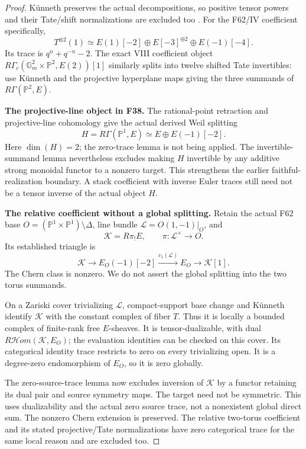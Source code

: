 \documentclass[11pt,a4paper]{article}
\newcommand{\fid}[1]{\textsf{#1}}\newcommand{\gate}[1]{\textsf{#1}}
\theoremstyle{named}\newtheorem{finding}{Finding}[section]
\theoremstyle{definition}\newtheorem{definition}[finding]{Definition}
\theoremstyle{remark}\newtheorem{remark}[finding]{Remark}
\begin{document}
\begin{proof}
K\"unneth preserves the actual decompositions,
so positive tensor powers and their Tate/shift
normalizations are excluded too
\cite[Theorem~22.1 and Remark~22.3(b)--(d),
pp.~135--136, with the following \(\ell\)-adic passage]{Milne}.
For the \fid{F62}/IV coefficient specifically,
\[
 T^{\otimes2}(1)\simeq
 E(1)[-2]\oplus E[-3]^{\oplus2}\oplus E(-1)[-4].
\]
Its trace is \(q^n+q^{-n}-2\).
The exact VIII coefficient object
\(R\Gamma_c(\mathbb G_m^2\times\mathbb P^2,E(2))[1]\)
similarly splits into twelve shifted Tate
invertibles: use K\"unneth and the projective
hyperplane maps giving the three summands of
\(R\Gamma(\mathbb P^2,E)\).

\par\smallskip\noindent\textbf{The projective-line object in \fid{F38}.}\quad
The rational-point retraction and projective-line
cohomology give the actual derived Weil splitting
\[
 H=R\Gamma(\mathbb P^1,E)
       \simeq E\oplus E(-1)[-2].
\]
Here \(\dim(H)=2\); the zero-trace lemma is not
being applied. The invertible-summand lemma
nevertheless excludes making \(H\) invertible
by any additive strong monoidal functor to a
nonzero target.
This strengthens the earlier faithful-realization
boundary. A stack coefficient with inverse
Euler traces still need not be a tensor inverse
of the actual object \(H\).

\par\smallskip\noindent\textbf{The relative coefficient without a global splitting.}\quad
Retain the actual \fid{F62} base
\(O=(\mathbb P^1\times\mathbb P^1)\setminus\Delta\),
line bundle \(\mathcal L=O(1,-1)|_O\), and
\[
 \mathcal K=R\pi_!E,\qquad
 \pi:\mathcal L^\times\to O.
\]
Its established triangle is
\[
 \mathcal K\longrightarrow E_O(-1)[-2]
   \xrightarrow{c_1(\mathcal L)}E_O
   \longrightarrow\mathcal K[1].
\]
The Chern class is nonzero. We do not assert
the global splitting into the two torus summands.

On a Zariski cover trivializing \(\mathcal L\),
compact-support base change and K\"unneth identify
\(\mathcal K\) with the constant complex of fiber \(T\).
Thus it is locally a bounded complex of finite-rank
free \(E\)-sheaves. It is tensor-dualizable, with
dual \(R\mathcal Hom(\mathcal K,E_O)\);
the evaluation identities can be checked on this cover.
Its categorical identity trace restricts to zero
on every trivializing open. It is a degree-zero
endomorphism of \(E_O\), so it is zero globally.

The zero-source-trace lemma now excludes inversion
of \(\mathcal K\) by a functor retaining its
dual pair and source symmetry maps. The target
need not be symmetric.
This uses dualizability and the actual zero
source trace, not a nonexistent global direct sum.
The nonzero Chern extension is preserved.
The relative two-torus coefficient and its stated
projective/Tate normalizations have zero categorical
trace for the same local reason and are excluded too.
\end{proof}
\end{document}
